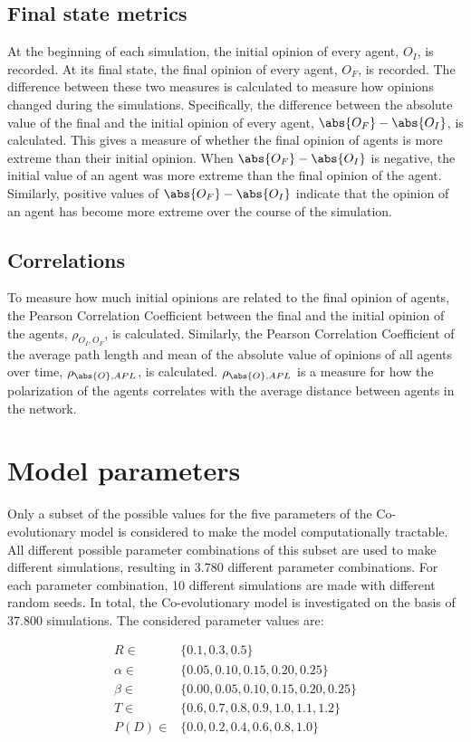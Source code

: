 \documentclass[11pt]{article}
\DeclarePairedDelimiter{\abs}\lvert\rvert
\begin{document}
\subsection{Final state metrics}
At the beginning of each simulation, the initial opinion of every agent, $O_I$, is recorded. At its final state, the final opinion of every agent, $O_F$, is recorded. 
The difference between these two measures is calculated to measure how opinions changed during the simulations. Specifically, the difference between the absolute value of the final and the initial opinion of every agent, $\abs{O_F} - \abs{O_I}$, is calculated. This gives a measure of whether the final opinion of agents is more extreme than their initial opinion. When $\abs{O_F} - \abs{O_I}$ is negative, the initial value of an agent was more extreme than the final opinion of the agent. Similarly, positive values of $\abs{O_F} - \abs{O_I}$ indicate that the opinion of an agent has become more extreme over the course of the simulation. 

\subsection{Correlations}
To measure how much initial opinions are related to the final opinion of agents, the Pearson Correlation Coefficient between the final and the initial opinion of the agents, $\rho_{O_I, O_F}$, is calculated.
Similarly, the Pearson Correlation Coefficient of the average path length and mean of the absolute value of opinions of all agents over time, $\rho_{\abs{O}, APL}$, is calculated. $\rho_{\abs{O}, APL}$ is a measure for how the polarization of the agents correlates with the average distance between agents in the network.

\section{Model parameters}

Only a subset of the possible values for the five parameters of the Co-evolutionary model is considered to make the model computationally tractable. All different possible parameter combinations of this subset are used to make different simulations, resulting in 3.780 different parameter combinations. For each parameter combination, 10 different simulations are made with different random seeds. In total, the Co-evolutionary model is investigated on the basis of 37.800 simulations. The considered parameter values are:

\begin{align*}
    R \in & \{0.1, 0.3, 0.5\} \\
    \alpha \in & \{0.05, 0.10, 0.15, 0.20, 0.25\} \\
    \beta \in & \{0.00, 0.05, 0.10, 0.15, 0.20, 0.25\}\\
    T \in & \{0.6, 0.7, 0.8, 0.9, 1.0, 1.1, 1.2\}\\
    P(D) \in & \{0.0, 0.2, 0.4, 0.6, 0.8, 1.0\}\\
\end{align*}
\end{document}
